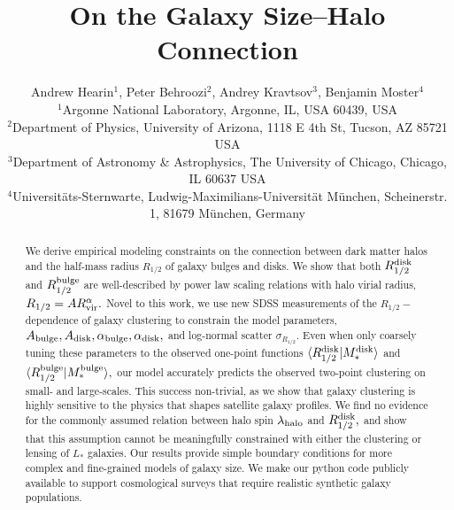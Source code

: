 \documentclass[usenatbib,usegraphicx,letterpaper]{mn2e}
\newcommand{\rhalf}{R_{1/2}}
\newcommand{\rhalfdisk}{R_{1/2}^{\rm disk}}
\newcommand{\rhalfbulge}{R_{1/2}^{\rm bulge}}
\newcommand{\rvir}{R_{\rm vir}}
\newcommand{\mstar}{M_{\ast}}
\newcommand{\halospin}{\lambda_{\rm halo}}
\begin{document}
\title[The Galaxy Size--Halo Connection]
{On the Galaxy Size--Halo Connection}


\author[Hearin, Behroozi, Kravtsov \& Moster]{
Andrew Hearin$^{1}$, Peter Behroozi$^{2}$, Andrey Kravtsov$^{3}$, Benjamin Moster$^{4}$\\
$^{1}$Argonne National Laboratory, Argonne, IL, USA 60439, USA\\
$^{2}$Department of Physics, University of Arizona, 1118 E 4th St, Tucson, AZ 85721 USA\\
$^{3}$Department of Astronomy \& Astrophysics, The University of Chicago, Chicago, IL 60637 USA\\
$^{4}$Universit{\"a}ts-Sternwarte, Ludwig-Maximilians-Universit{\"a}t M{\"u}nchen, Scheinerstr. 1, 81679 M{\"u}nchen, Germany
}

\maketitle

\begin{abstract}
We derive empirical modeling constraints on the connection between dark matter halos and the half-mass radius $\rhalf$ of galaxy bulges and disks. We show that both $\rhalfdisk$ and $\rhalfbulge$ are well-described by power law scaling relations with halo virial radius, $\rhalf=A\rvir^{\alpha}.$ Novel to this work, we use new SDSS measurements of the $\rhalf-$dependence of galaxy clustering to constrain the model parameters, $A_{\rm bulge}, A_{\rm disk}, \alpha_{\rm bulge},\alpha_{\rm disk},$ and log-normal scatter $\sigma_{R_{1/2}}.$ Even when only coarsely tuning these parameters to the observed one-point functions $\langle\rhalfdisk|\mstar^{\rm disk}\rangle$ and $\langle\rhalfbulge|\mstar^{\rm bulge}\rangle,$ our model accurately predicts the observed two-point clustering on small- and large-scales. This success non-trivial, as we show that galaxy clustering is highly sensitive to the physics that shapes satellite galaxy profiles. We find no evidence for the commonly assumed relation between halo spin $\halospin$ and $\rhalfdisk,$ and show that this assumption cannot be meaningfully constrained with either the clustering or lensing of  $L_{\ast}$ galaxies. Our results provide simple boundary conditions for more complex and fine-grained models of galaxy size. We make our python code publicly available to support cosmological surveys that require realistic synthetic galaxy populations.
\end{abstract}
\end{document}
